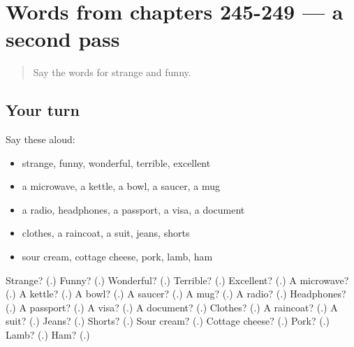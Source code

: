 \section[(dialogue)]{Words from chapters 245-249 — a second pass}

\label{lesson:RU-R249-second-pass-words-from-chapters-245-249}



\begin{quote}
Say the words for strange and funny.
\end{quote}

\subsection*{Your turn}
Say these aloud:

\begin{itemize}
\raggedright
  \item strange, funny, wonderful, terrible, excellent
  \item a microwave, a kettle, a bowl, a saucer, a mug
  \item a radio, headphones, a passport, a visa, a document
  \item clothes, a raincoat, a suit, jeans, shorts
  \item sour cream, cottage cheese, pork, lamb, ham
\end{itemize}

\begin{tcolorbox}[breakable,colback=teal!4,colframe=teal!35!black,title={Before you move on}]
Strange? (\textbf{}.) Funny? (\textbf{}.) Wonderful? (\textbf{}.) Terrible? (\textbf{}.) Excellent? (\textbf{}.) A microwave? (\textbf{}.) A kettle? (\textbf{}.) A bowl? (\textbf{}.) A saucer? (\textbf{}.) A mug? (\textbf{}.) A radio? (\textbf{}.) Headphones? (\textbf{}.) A passport? (\textbf{}.) A visa? (\textbf{}.) A document? (\textbf{}.) Clothes? (\textbf{}.) A raincoat? (\textbf{}.) A suit? (\textbf{}.) Jeans? (\textbf{}.) Shorts? (\textbf{}.) Sour cream? (\textbf{}.) Cottage cheese? (\textbf{}.) Pork? (\textbf{}.) Lamb? (\textbf{}.) Ham? (\textbf{}.)
\end{tcolorbox}

